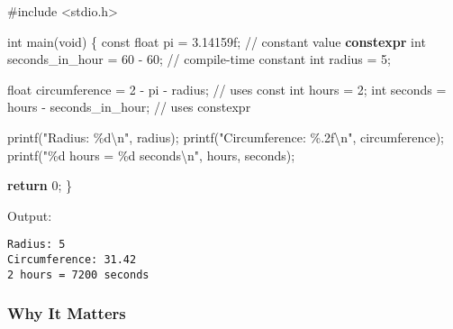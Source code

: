 \documentclass[
  letterpaper,
  DIV=11,
  numbers=noendperiod]{scrreprt}
\newenvironment{Shaded}{\begin{snugshade}}{\end{snugshade}}
\newcommand{\BuiltInTok}[1]{\textcolor[rgb]{0.00,0.23,0.31}{#1}}
\newcommand{\CommentTok}[1]{\textcolor[rgb]{0.37,0.37,0.37}{#1}}
\newcommand{\ControlFlowTok}[1]{\textcolor[rgb]{0.00,0.23,0.31}{\textbf{#1}}}
\newcommand{\DataTypeTok}[1]{\textcolor[rgb]{0.68,0.00,0.00}{#1}}
\newcommand{\DecValTok}[1]{\textcolor[rgb]{0.68,0.00,0.00}{#1}}
\newcommand{\FloatTok}[1]{\textcolor[rgb]{0.68,0.00,0.00}{#1}}
\newcommand{\ImportTok}[1]{\textcolor[rgb]{0.00,0.46,0.62}{#1}}
\newcommand{\KeywordTok}[1]{\textcolor[rgb]{0.00,0.23,0.31}{\textbf{#1}}}
\newcommand{\NormalTok}[1]{\textcolor[rgb]{0.00,0.23,0.31}{#1}}
\newcommand{\OperatorTok}[1]{\textcolor[rgb]{0.37,0.37,0.37}{#1}}
\newcommand{\PreprocessorTok}[1]{\textcolor[rgb]{0.68,0.00,0.00}{#1}}
\newcommand{\SpecialCharTok}[1]{\textcolor[rgb]{0.37,0.37,0.37}{#1}}
\newcommand{\StringTok}[1]{\textcolor[rgb]{0.13,0.47,0.30}{#1}}
\begin{document}
\begin{Shaded}
\begin{Highlighting}[]
\PreprocessorTok{\#include }\ImportTok{\textless{}stdio.h\textgreater{}}

\DataTypeTok{int}\NormalTok{ main}\OperatorTok{(}\DataTypeTok{void}\OperatorTok{)} \OperatorTok{\{}
    \DataTypeTok{const} \DataTypeTok{float}\NormalTok{ pi }\OperatorTok{=} \FloatTok{3.14159}\BuiltInTok{f}\OperatorTok{;}              \CommentTok{// constant value}
    \KeywordTok{constexpr} \DataTypeTok{int}\NormalTok{ seconds\_in\_hour }\OperatorTok{=} \DecValTok{60} \OperatorTok{{-}} \DecValTok{60}\OperatorTok{;} \CommentTok{// compile{-}time constant}
    \DataTypeTok{int}\NormalTok{ radius }\OperatorTok{=} \DecValTok{5}\OperatorTok{;}

    \DataTypeTok{float}\NormalTok{ circumference }\OperatorTok{=} \DecValTok{2} \OperatorTok{{-}}\NormalTok{ pi }\OperatorTok{{-}}\NormalTok{ radius}\OperatorTok{;}  \CommentTok{// uses const}
    \DataTypeTok{int}\NormalTok{ hours }\OperatorTok{=} \DecValTok{2}\OperatorTok{;}
    \DataTypeTok{int}\NormalTok{ seconds }\OperatorTok{=}\NormalTok{ hours }\OperatorTok{{-}}\NormalTok{ seconds\_in\_hour}\OperatorTok{;}  \CommentTok{// uses constexpr}

\NormalTok{    printf}\OperatorTok{(}\StringTok{"Radius: }\SpecialCharTok{\%d\textbackslash{}n}\StringTok{"}\OperatorTok{,}\NormalTok{ radius}\OperatorTok{);}
\NormalTok{    printf}\OperatorTok{(}\StringTok{"Circumference: }\SpecialCharTok{\%.2f\textbackslash{}n}\StringTok{"}\OperatorTok{,}\NormalTok{ circumference}\OperatorTok{);}
\NormalTok{    printf}\OperatorTok{(}\StringTok{"}\SpecialCharTok{\%d}\StringTok{ hours = }\SpecialCharTok{\%d}\StringTok{ seconds}\SpecialCharTok{\textbackslash{}n}\StringTok{"}\OperatorTok{,}\NormalTok{ hours}\OperatorTok{,}\NormalTok{ seconds}\OperatorTok{);}

    \ControlFlowTok{return} \DecValTok{0}\OperatorTok{;}
\OperatorTok{\}}
\end{Highlighting}
\end{Shaded}

Output:

\begin{verbatim}
Radius: 5
Circumference: 31.42
2 hours = 7200 seconds
\end{verbatim}

\subsubsection{Why It Matters}\label{why-it-matters-8}
\end{document}
